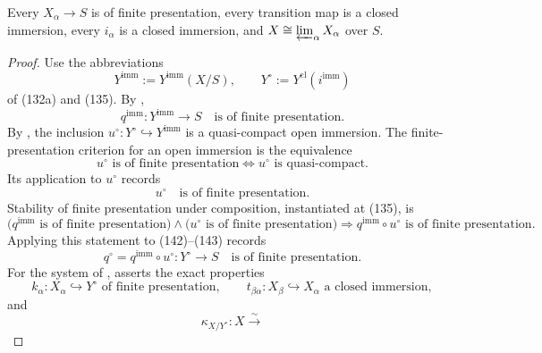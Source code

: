 \begin{lemma}
  \label{lemma:nagata-finite-type-fp-model-system}
  \lean{}

  Every $X_\alpha\to S$ is of finite presentation, every transition map is a
  closed immersion, every $i_\alpha$ is a closed immersion, and
  $X\cong\varprojlim_\alpha X_\alpha$ over $S$.
\end{lemma}

\begin{proof}
  Use the abbreviations
  \[
    Y^{\mathrm{imm}}:=Y^{\mathrm{imm}}(X/S),
    \qquad
    Y^\circ:=Y^{\mathrm{cl}}(i^{\mathrm{imm}})
  \]
  of (132a) and (135).  By
  ,
  \[
    q^{\mathrm{imm}}\colon Y^{\mathrm{imm}}\longrightarrow S
      \quad\text{is of finite presentation}.                   \tag{142}
  \]
  By , the inclusion
  $u^\circ\colon Y^\circ\hookrightarrow Y^{\mathrm{imm}}$ is a
  quasi-compact open immersion.  The finite-presentation criterion for an
  open immersion is the equivalence
  \[
    u^\circ\text{ is of finite presentation}
      \Longleftrightarrow
    u^\circ\text{ is quasi-compact}.
  \]
  Its application to $u^\circ$ records
  \[
    u^\circ\quad\text{is of finite presentation}.              \tag{143}
  \]
  Stability of finite presentation under composition, instantiated at
  (135), is
  \[
    \bigl(q^{\mathrm{imm}}\text{ is of finite presentation}\bigr)
      \wedge
    \bigl(u^\circ\text{ is of finite presentation}\bigr)
      \Longrightarrow
    q^{\mathrm{imm}}\circ u^\circ\text{ is of finite presentation}.
  \]
  Applying this statement to (142)--(143) records
  \[
    q^\circ=q^{\mathrm{imm}}\circ u^\circ\colon Y^\circ\to S
      \quad\text{is of finite presentation}.                   \tag{144}
  \]
  For the system of
  ,
   asserts the exact
  properties
  \[
    k_\alpha\colon X_\alpha\hookrightarrow Y^\circ
      \text{ of finite presentation},
    \qquad
    t_{\beta\alpha}\colon X_\beta\hookrightarrow X_\alpha
      \text{ a closed immersion},                              \tag{145}
  \]
  and
  \[
    \kappa_{X/Y^\circ}\colon X\xrightarrow{\sim}
\]
\end{proof}
